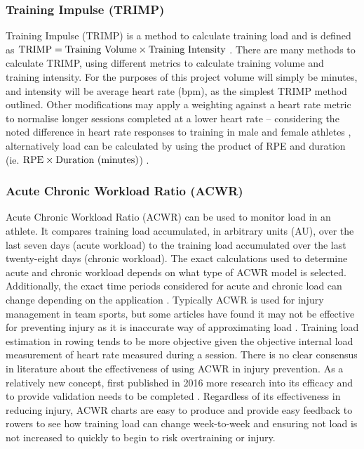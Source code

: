 \subsubsection{Training Impulse (TRIMP)}
Training Impulse (TRIMP) is a method to calculate training load and is defined as  $\textnormal{TRIMP} = \textnormal{Training Volume} \times \textnormal{Training Intensity}$ \autocite{TRIMPmethod}. There are many methods to calculate TRIMP, using different metrics to calculate training volume and training intensity. For the purposes of this project volume will simply be minutes, and intensity will be average heart rate (bpm), as the simplest TRIMP method outlined. Other modifications may apply a weighting against a heart rate metric to normalise longer sessions completed at a lower heart rate -- considering the noted difference in heart rate responses to training in male and female athletes \autocite{Morton1990}, alternatively load can be calculated by using the product of RPE and duration (ie. $\textnormal{RPE} \times \textnormal{Duration (minutes)}$) .

\subsubsection{Acute Chronic Workload Ratio (ACWR)}
Acute Chronic Workload Ratio (ACWR) can be used to monitor load in an athlete. It compares training load accumulated, in arbitrary units (AU), over the last seven days (acute workload) to the training load accumulated over the last twenty-eight days (chronic workload). The exact calculations used to determine acute and chronic workload depends on what type of ACWR model is selected. Additionally, the exact time periods considered for acute and chronic load can change depending on the application \cite{White2023}. Typically ACWR is used for injury management in team sports, but some articles have found it may not be effective for preventing injury as it is inaccurate way of approximating load \cite{Impellizzeri2020}. Training load estimation in rowing tends to be more objective given the objective internal load measurement of heart rate measured during a session. There is no clear consensus in literature about the effectiveness of using ACWR in injury prevention. As a relatively new concept, first published in 2016 more research into its efficacy and to provide validation needs to be completed \cite{Zouhal2021}. Regardless of its effectiveness in reducing injury, ACWR charts are easy to produce and provide easy feedback to rowers to see how training load can change week-to-week and ensuring not load is not increased to quickly to begin to risk overtraining or injury.


